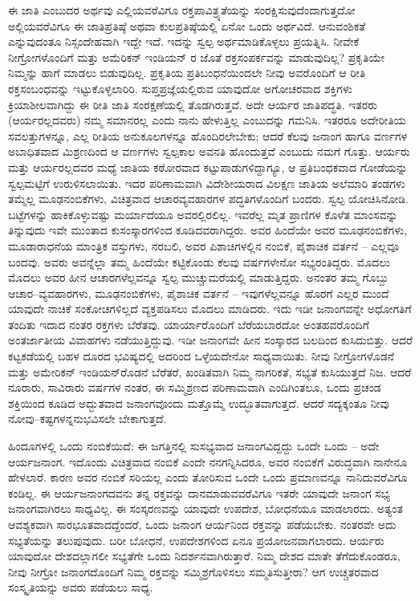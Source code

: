 ಈ ಜಾತಿ ಎಂಬುದರ ಅರ್ಥವು ಎಲ್ಲಿಯವರೆವಿಗೂ ರಕ್ತಪಾವಿತ್ರ್ಯತೆಯನ್ನು ಸಂರಕ್ಷಿಸುವುದೆಂದಾಗುತ್ತದೋ ಅಲ್ಲಿಯವರೆವಿಗೂ ಈ ಜಾತಿಪ್ರತಿಷ್ಠೆ ಅಥವಾ ಕುಲಪ್ರತಿಷ್ಠೆಯಲ್ಲಿ ಏನೋ ಒಂದು ಅರ್ಥವಿದೆ. ಆನುವಂಶಿಕತೆ ಎನ್ನುವುದಂತೂ ನಿಸ್ಸಂದೇಹವಾಗಿ ಇದ್ದೇ ಇದೆ. ಇದನ್ನು ಸ್ವಲ್ಪ ಅರ್ಥಮಾಡಿಕೊಳ್ಳಲು ಪ್ರಯತ್ನಿಸಿ. ನೀವೇಕೆ ನೀಗ್ರೋಗಳೊಂದಿಗೆ ಮತ್ತು ಅಮೆರಿಕನ್ ಇಂಡಿಯನ್ ರ ಜೊತೆ ರಕ್ತಸಂಪರ್ಕವನ್ನು ಮಾಡುವುದಿಲ್ಲ? ಪ್ರಕೃತಿಯೇ ನಿಮ್ಮನ್ನು ಹಾಗೆ ಮಾಡಲು ಬಿಡುವುದಿಲ್ಲ. ಪ್ರಕೃತಿಯ ಪ್ರತಿಬಂಧನೆಯಿಂದಲೇ ನೀವು ಅವರೊಂದಿಗೆ ಆ ರೀತಿ ರಕ್ತಸಂಬಂಧವನ್ನು ಇಟ್ಟುಕೊಳ್ಳಲಾರಿರಿ. ಸುಪ್ತಪ್ರಜ್ಞೆಯಲ್ಲಿರುವ ಯಾವುದೋ ಅಗೋಚರವಾದ ಶಕ್ತಿಗಳು ಕ್ರಿಯಾಶೀಲವಾಗಿದ್ದು ಈ ರೀತಿ ಜಾತಿ ಸಂರಕ್ಷಣೆಯಲ್ಲಿ ತೊಡಗಿರುತ್ತವೆ. ಅದೇ ಆರ್ಯರ ಜಾತಿಪದ್ಧತಿ. ಇತರರು (ಆರ್ಯರಲ್ಲದವರು) ನಮ್ಮ ಸಮಾನರಲ್ಲ ಎಂದು ನಾನು ಹೇಳುತ್ತಿಲ್ಲ ಎಂಬುದನ್ನು ಗಮನಿಸಿ. ಇತರರೂ ಅದೇರೀತಿಯ ಸವಲತ್ತುಗಳನ್ನೂ, ಎಲ್ಲ ರೀತಿಯ ಅನುಕೂಲಗಳನ್ನೂ ಹೊಂದಿರಲೇಬೇಕು; ಆದರೆ ಕೆಲವು ಜನಾಂಗ ಹಾಗೂ ವರ್ಣಗಳ ಅಬಾಧಿತವಾದ ಮಿಶ್ರಣದಿಂದ ಆ ವರ್ಣಗಳು ಸ್ವಲ್ಪಕಾಲ ಅವನತಿ ಹೊಂದುತ್ತವೆ ಎಂಬುದು ನಮಗೆ ಗೊತ್ತು. ಆರ್ಯರು ಮತ್ತು ಆರ್ಯರಲ್ಲದವರ ಮಧ್ಯೆ ಜಾತಿಯ ಕಠೋರವಾದ ಕಟ್ಟುಪಾಡುಗಳಿದ್ದಾಗ್ಯೂ, ಆ ಪ್ರತಿಬಂಧಕವಾದ ಗೋಡೆಯನ್ನು ಸ್ವಲ್ಪಮಟ್ಟಿಗೆ ಉರುಳಿಸಲಾಯಿತು. ಇದರ ಪರಿಣಾಮವಾಗಿ ವಿದೇಶೀಯರಾದ ವಿಲಕ್ಷಣ ಜಾತಿಯ ಅಲೆಮಾರಿ ತಂಡಗಳು ತಮ್ಮೆಲ್ಲ ಮೂಢನಂಬಿಕೆಗಳು, ವಿಚಿತ್ರವಾದ ಆಚಾರವ್ಯವಹಾರಗಳ ಪದ್ಧತಿಗಳೊಂದಿಗೆ ಬಂದರು. ಸ್ವಲ್ಪ ಯೋಚಿಸಿನೋಡಿ. ಬಟ್ಟೆಗಳನ್ನು ಹಾಕಿಕೊಳ್ಳುವಷ್ಟು ಮರ್ಯಾದೆಯೂ ಅವರಲ್ಲಿರಲಿಲ್ಲ. ಇವರೆಲ್ಲ ಮೃತ ಪ್ರಾಣಿಗಳ ಕೊಳೆತ ಮಾಂಸವನ್ನು ತಿನ್ನುವುದು ಇವೇ ಮುಂತಾದ ಕುಸಂಸ್ಕಾರಗಳಿಂದ ಕೂಡಿದವರಾಗಿದ್ದರು. ಅವರ ಹಿಂದೆಯೇ ಅವರ ಮೂಢನಂಬಿಕೆಗಳು, ಮೂಡಾರಾಧನೆಯ ಮಾಂತ್ರಿಕ ವಸ್ತುಗಳು, ನರಬಲಿ, ಅವರ ಪಿಶಾಚಿಗಳಲ್ಲಿನ ನಂಬಿಕೆ, ಪೈಶಾಚಿಕ ವರ್ತನೆ – ಎಲ್ಲವೂ ಬಂದವು. ಅವರು ಅವನ್ನೆಲ್ಲಾ ತಮ್ಮ ಹಿಂದೆಯೇ ಕಟ್ಟಿಕೊಂಡು ಕೆಲವು ವರ್ಷಗಳೇನೋ ಸಭ್ಯರಂತಿದ್ದರು. ಮೊದಲು ಮೊದಲು ಅವರ ಹೀನ ಆಚಾರಗಳೆಲ್ಲವನ್ನೂ ಸ್ವಲ್ಪ ಮುಚ್ಚುಮರೆಯಲ್ಲಿ ಮಾಡುತ್ತಿದ್ದರು. ಅನಂತರ ತಮ್ಮ ಗೊಬ್ಬು ಆಚಾರ–ವ್ಯವಹಾರಗಳು, ಮೂಢನಂಬಿಕೆಗಳು, ಪೈಶಾಚಿಕ ವರ್ತನೆ – ಇವುಗಳೆಲ್ಲವನ್ನೂ ಹೊರಗೆ ಎಲ್ಲರ ಮುಂದೆ ಯಾವುದೇ ನಾಚಿಕೆ ಸಂಕೋಚಗಳಿಲ್ಲದೆ ವ್ಯಕ್ತಪಡಿಸಲು ಮೊದಲು ಮಾಡಿದರು. ಇದು ಇಡೀ ಜನಾಂಗವನ್ನೇ ಅಧೋಗತಿಗೆ ತಂದಿತು ಇದಾದ ನಂತರ ರಕ್ತಗಳು ಬೆರೆತವು. ಯಾರ್ಯಾರೊಂದಿಗೆ ಬೆರೆಯಬಾರದೋ ಅಂತಹವರೊಂದಿಗೆ ಅಂತರ್ಜಾತೀಯ ವಿವಾಹಗಳು ನಡೆಯುತ್ತಿದ್ದುವು. ಇಡೀ ಜನಾಂಗವೇ ಹೀನ ಸಂಸ್ಕಾರದ ಬಲದಿಂದ ಕುಸಿದುಬಿತ್ತು. ಆದರೆ ಕಟ್ಟಕಡೆಯಲ್ಲಿ ಬಹಳ ದೂರದ ಭವಿಷ್ಯದಲ್ಲಿ ಅದರಿಂದ ಒಳ್ಳೆಯದೇನೋ ಸಾಧ್ಯವಾಯಿತು. ನೀವು ನೀಗ್ರೋಗಳೊಡನೆ ಮತ್ತು ಅಮೇರಿಕನ್ ಇಂಡಿಯನ್‌ರೊಡನೆ ಬೆರೆತರೆ, ಖಂಡಿತವಾಗಿ ನಿಮ್ಮ ನಾಗರಿಕತೆ, ಸಭ್ಯತೆ ಕುಸಿಯುತ್ತದೆ ನಿಜ. ಆದರೆ ನೂರಾರು, ಸಾವಿರಾರು ವರ್ಷಗಳ ನಂತರ, ಈ ಸಮ್ಮಿಶ್ರಣದ ಪರಿಣಾಮವಾಗಿ ಎಂದಿಗಿಂತಲೂ, ಒಂದು ಪ್ರಚಂಡ ಶಕ್ತಿಯಿಂದ ಕೂಡಿದ ಅದ್ಭುತವಾದ ಜನಾಂಗವೊಂದು ಮತ್ತೊಮ್ಮೆ ಉದ್ಭೂತವಾಗುತ್ತದೆ. ಆದರೆ ಸದ್ಯಕ್ಕಂತೂ ನೀವು ನೋವು–ಕಷ್ಟಗಳನ್ನನುಭವಿಸಲೇ ಬೇಕಾಗುತ್ತದೆ.

ಹಿಂದೂಗಳಲ್ಲಿ ಒಂದು ನಂಬಿಕೆಯಿದೆ: ಈ ಜಗತ್ತಿನಲ್ಲಿ ಸುಸಭ್ಯವಾದ ಜನಾಂಗವಿದ್ದದ್ದು ಒಂದೇ ಒಂದು – ಅದೇ ಆರ್ಯಜನಾಂಗ. ಇದೊಂದು ವಿಚಿತ್ರವಾದ ನಂಬಿಕೆ ಎಂದೇ ನನಗನ್ನಿಸಿದರೂ, ಅವರ ನಂಬಿಕೆಗೆ ವಿರುದ್ಧವಾಗಿ ನಾನೇನೂ ಹೇಳಲಾರೆ. ಕಾರಣ ಅವರ ನಂಬಿಕೆ ಸರಿಯಲ್ಲ ಎಂದು ತೋರಿಸುವ ಒಂದೇ ಒಂದು ಪ್ರಮಾಣವನ್ನೂ ನಾನಿದುವರೆವಿಗೂ ಕಂಡಿಲ್ಲ. ಈ ಆರ್ಯಜನಾಂಗದವನು ತನ್ನ ರಕ್ತವನ್ನು ದಾನಮಾಡುವವರೆವಿಗೂ ಇತರೇ ಯಾವುದೇ ಜನಾಂಗ ಸಭ್ಯ ಜನಾಂಗವಾಗಿರಲು ಸಾಧ್ಯವಿಲ್ಲ. ಈ ಸಂಸ್ಕರಣವನ್ನು ಯಾವುದೇ ಉಪದೇಶ, ಬೋಧನೆಯೂ ಮಾಡಲಾರದು. ಅತ್ಯಂತ ಆವಶ್ಯಕವಾಗಿ ಸಾರಭೂತವಾದದ್ದೆಂದರೆ, ಒಂದು ಜನಾಂಗ ಆರ್ಯನಿಂದ ರಕ್ತವನ್ನು ಪಡೆಯಬೇಕು. ನಂತರವೇ ಅದು ಸಭ್ಯತೆಯನ್ನು ತಲುಪುವುದು. ಬರೀ ಬೋಧನೆ, ಉಪದೇಶಗಳಿಂದ ಏನೂ ಪ್ರಯೋಜನವಾಗಲಾರದು. ಆರ್ಯರು ಯಾವುದೋ ದೇಶದಲ್ಲಾಗಲೀ ಸಭ್ಯತೆಗೇ ಒಂದು ನಿದರ್ಶನವಾಗಿರುತ್ತಾರೆ. ನಿಮ್ಮ ದೇಶದ ಮಾತೇ ತೆಗೆದುಕೊಂಡರೂ, ನೀವು ನೀಗ್ರೋ ಜನಾಂಗದೊಂದಿಗೆ ನಿಮ್ಮ ರಕ್ತವನ್ನು ಸಮ್ಮಿಶ್ರಗೊಳಿಸಲು ಸಮ್ಮತಿಸುತ್ತೀರಾ? ಆಗ ಉಚ್ಚತರವಾದ ಸಂಸ್ಕೃತಿಯನ್ನು ಅವರು ಪಡೆಯಲು ಸಾಧ್ಯ.

